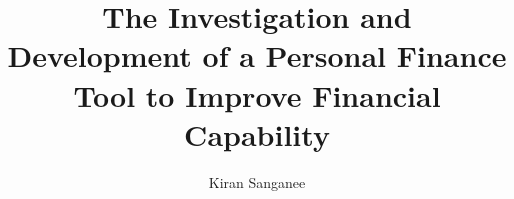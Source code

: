 
\author{Kiran Sanganee}
\title{The Investigation and Development of a Personal Finance Tool to Improve Financial Capability}

